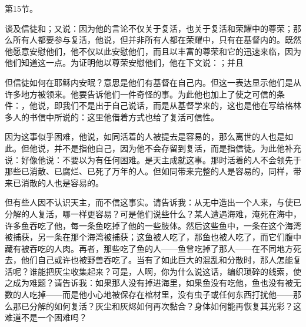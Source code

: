 第15节。\par

谈及信徒和；又说：因为他的言论不仅关于复活，也关于复活和荣耀中的尊荣；那么所有人都要参与复活，他说，但并非所有人都在荣耀中，只有在基督内的。既然他愿意安慰他们，他不仅以此安慰他们，而且以丰富的尊荣和它的迅速来临，因为他们知道这一点。为证明他以尊荣安慰他们，他在下文说：；并且\par

但信徒如何在耶稣内安眠？意思是他们有基督在自己内。但这一表达显示他们是从许多地方被领来。他要告诉他们一件奇怪的事。为此他也加上了使之可信的条件：，他说，即我们不是出于自己说话，而是从基督学来的，这也是他在写给格林多人的书信中所说的：这里他借着方式也给了复活可信性。\par

因为这事似乎困难，他说，如同活着的人被提去是容易的，那么离世的人也是如此。但他说，并不是指他自己，因为他不会存留到复活，而是指信徒。为此他补充说：好像他说：不要以为有任何困难。是天主成就这事。那时活着的人不会领先于那些已消散、已腐烂、已死了万年的人。但如同带来完整的人是容易的，同样，带来已消散的人也是容易的。\par

但有些人因不认识天主，而不信这事实。请告诉我：从无中造出一个人来，与使已分解的人复活，哪一样更容易？可是他们说些什么？某人遭遇海难，淹死在海中，许多鱼吞吃了他，每一条鱼吃掉了他的一些肢体。然后这些鱼中，一条在这个海湾被捕获，另一条在那个海湾被捕获；这鱼被人吃了，那鱼也被人吃了，而它们腹中藏有被吞吃的人肉。再者，那些吃了鱼的人——鱼曾吃掉了那人——在不同地方死去，他们自己或许也被野兽吞吃了。当有了如此巨大的混乱和分散时，那人怎能复活呢？谁能把灰尘收集起来？可是，人啊，你为什么说这话，编织琐碎的线索，使之成为难题？请告诉我：如果那人没有掉进海里，如果鱼没有吃他，鱼也没有被无数的人吃掉——而是他小心地被保存在棺材里，没有虫子或任何东西打扰他——那么那已分解的如何复活？灰尘和灰烬如何再次黏合？身体如何能再恢复其光彩？这难道不是一个困难吗？\par

